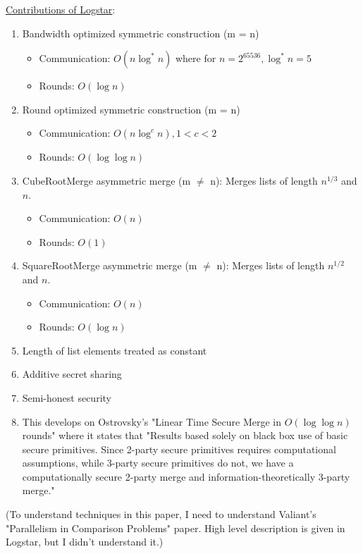 \underline{Contributions of Logstar}:
\begin{enumerate}
   \item Bandwidth optimized symmetric construction (m = n)
    \begin{itemize}
        \item Communication: $O(n \log ^* n)$ where for $n = 2^{65536}, \log ^* n = 5$
        \item Rounds: $O(\log n)$
    \end{itemize}
    \item Round optimized symmetric construction (m = n)
    \begin{itemize}
        \item Communication: $O(n \log ^c n), 1 < c < 2$ 
        \item Rounds: $O(\log \log n)$ 
    \end{itemize}
    \item CubeRootMerge asymmetric merge (m $\ne$ n): Merges lists of length $n^{1/3}$ and $n$.
    \begin{itemize}
        \item Communication: $O(n)$ 
        \item Rounds: $O(1)$ 
    \end{itemize}
    \item SquareRootMerge asymmetric merge (m $\ne$ n): Merges lists of length $n^{1/2}$ and $n$.

    \begin{itemize}
        \item Communication: $O(n)$
        \item Rounds: $O(\log n)$
    \end{itemize}
    \item Length of list elements treated as constant
    \item Additive secret sharing
    \item Semi-honest security
    \item This develops on Ostrovsky's "Linear Time Secure Merge in $O(\log \log n)$ rounds" where it states that "Results based solely on black box use of basic secure primitives. Since 2-party secure primitives requires computational assumptions, while 3-party secure primitives do not, we have a computationally secure 2-party merge and information-theoretically 3-party merge."
\end{enumerate}

(To understand techniques in this paper, I need to understand Valiant's "Parallelism in Comparison Problems" paper. High level description is given in Logstar, but I didn't understand it.)



%
